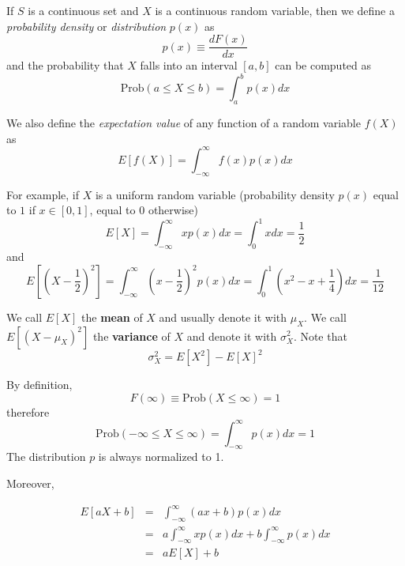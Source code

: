 \documentclass[justified, sixbynine]{tufte-book}
\theoremstyle{plain}%
\newtheorem * {corollary}{Corollary}
\theoremstyle{definition}
\theoremstyle{remark}
\newtheorem * {remark}{Remark}
\newtheorem * {note}{Note}
\begin{document}
\begin{fullwidth}
If $S$ is a continuous set and $X$ is a continuous random variable, then we
define a {\it probability density} or {\it distribution} $p(x)$ as
\begin{equation}
p(x)\equiv \frac{dF(x)}{dx}
\end{equation}
and the probability that $X$ falls into an interval $[a, b]$ can be computed
as
\begin{equation}
\textrm{Prob}(a\leq X\leq b)=\int_a^bp(x)dx
\end{equation}


We also define the {\it expectation value} of any function of a random
variable $f(X)$ as
\begin{equation}
E[f(X)]=\int_{-\infty }^\infty f(x)p(x)dx
\end{equation}

For example, if $X$ is a uniform random variable (probability density $p(x)$ equal to $1$ if
$x\in [0, 1]$, equal to $0$ otherwise)
\begin{equation}
E[X]=\int_{-\infty }^\infty xp(x)dx=\int_0^1xdx=\frac 12
\end{equation}
and
\begin{equation}
E[(X-\frac 12)^2]=\int_{-\infty }^\infty (x-\frac
12)^2p(x)dx=\int_0^1(x^2-x+\frac 14)dx=\frac 1{12}
\end{equation}

We call $E[X]$ the {\bf mean} of $X$ and usually denote it with $\mu _X$.
We call $E[(X-\mu _X)^2]$ the {\bf variance} of $X$ and denote it with $%
\sigma _X^2$. Note that
\begin{equation}
\sigma _X^2=E[X^2]-E[X]^2
\end{equation}

By definition,
\begin{equation}
F(\infty )\equiv \textrm{Prob}(X\leq \infty )=1
\end{equation}
therefore
\begin{equation}
\textrm{Prob}(-\infty \leq X\leq \infty )=\int_{-\infty }^\infty p(x)dx=1
\end{equation}
The distribution $p$ is always normalized to 1.

Moreover,

\begin{eqnarray}
E[aX+b] &=&\int_{-\infty }^\infty (ax+b)p(x)dx \\
&=&a\int_{-\infty }^\infty xp(x)dx+b\int_{-\infty }^\infty p(x)dx \\
&=&aE[X]+b
\end{eqnarray}


\end{fullwidth}
\end{document}
